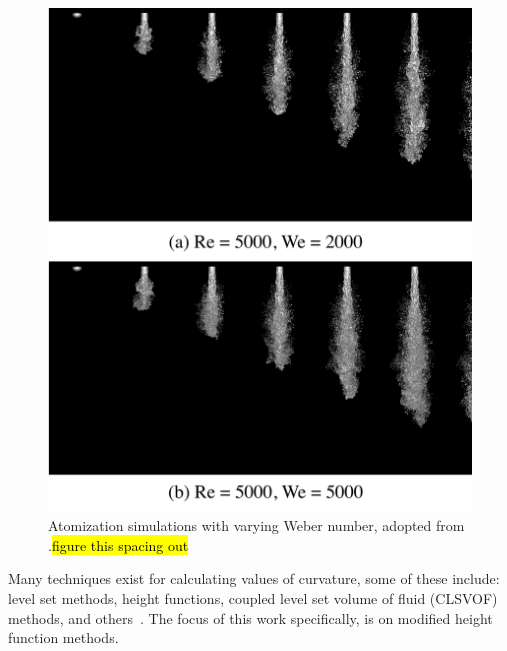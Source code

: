  \begin{figure}[htbp]
	\centering
	\includegraphics[width=5.0in]{figs/surf}
	\caption{Atomization simulations with varying Weber number, adopted from \cite{Desjardins13}.\hl{figure this spacing out}}
	\label{fig:surf}
\end{figure}

Many techniques exist for calculating values of curvature, some of these include:  level set methods,  height functions, coupled level set volume of fluid (CLSVOF) methods, and others~\cite{1,2,3,4}. The focus of this work specifically, is on modified height function methods.


